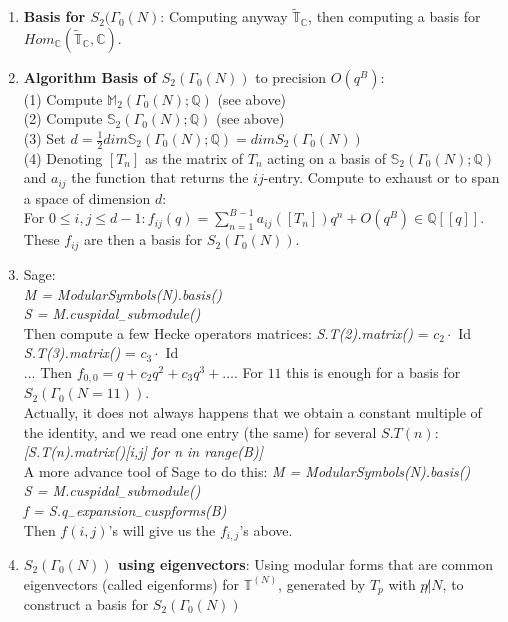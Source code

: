 \documentclass{article}
\newcommand{\Q}{\mathbb{Q}}
\newcommand{\C}{\mathbb{C}}
\begin{document}
\begin{multicols}{2}
\begin{enumerate}
\item \textbf{Basis for $S_2(\Gamma_0(N)$}: Computing anyway $\tilde{\mathbb{T}}_\C$, then computing a basis for $Hom_\C(\tilde{\mathbb{T}}_\C,\C)$.

\item \textbf{Algorithm Basis of $S_2(\Gamma_0(N))$} to precision $O(q^B)$:\\
(1) Compute $\mathbb{M}_2(\Gamma_0(N);\Q)$ (see above)\\
(2) Compute $\mathbb{S}_2(\Gamma_0(N);\Q)$ (see above)\\
(3) Set $d = \frac{1}{2} dim \mathbb{S}_2(\Gamma_0(N);\Q) = dim S_2(\Gamma_0(N))$\\
(4) Denoting $[T_n]$ as the matrix of $T_n$ acting on a basis of $\mathbb{S}_2(\Gamma_0(N);\Q)$ and $a_{ij}$ the function that returns the $ij$-entry. Compute to exhaust or to span a space of dimension $d$:\\
For $0 \leq i,j \leq d-1: f_{ij}(q) = \sum_{n=1}^{B-1} a_{ij}([T_n])q^n + O(q^B) \in \Q[[q]]$. These $f_{ij}$ are then a basis for $S_2(\Gamma_0(N))$. 



\item Sage: \\
\textit{M = ModularSymbols(N).basis()}\\
\textit{S = M.cuspidal$_-$submodule()}\\
Then compute a few Hecke operators matrices:
\textit{S.T(2).matrix()} = $c_2 \cdot$ Id\\
\textit{S.T(3).matrix()} = $c_3 \cdot$ Id\\
... Then $f_{0,0} = q + c_2q^2 + c_3q^3 + \ldots$.  For $11$ this is enough for a basis for $S_2(\Gamma_0(N = 11))$. \\
Actually, it does not always happens that we obtain a constant multiple of the identity, and we read one entry (the same) for several $S.T(n)$:\\
\textit{[S.T(n).matrix()[i,j] for n in range(B)]}\\

A more advance tool of Sage to do this:
\textit{M = ModularSymbols(N).basis()}\\
\textit{S = M.cuspidal$_-$submodule()}\\
\textit{f = S.q$_-$expansion$_-$cuspforms(B)}\\
Then $f(i,j)$'s will give us the $f_{i,j}$'s above. 

\item \textbf{$S_2(\Gamma_0(N))$ using eigenvectors}: Using modular forms that are common eigenvectors (called eigenforms) for $\mathbb{T}^{(N)}$, generated by $T_p$ with $p\not|N$, to construct a basis for $S_2(\Gamma_0(N))$ \\


\end{enumerate}
\end{multicols}
\end{document}
